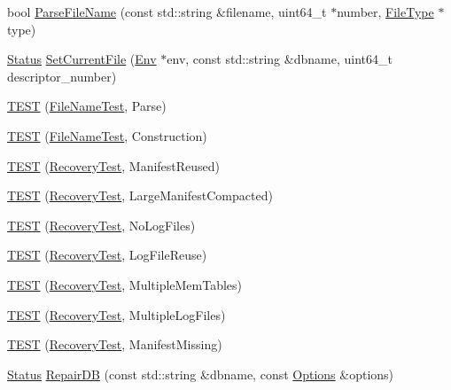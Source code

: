 \begin{DoxyCompactItemize}
bool \mbox{\hyperlink{namespaceleveldb_aa6901bbe2ff664657a6d4e01ba7d6d39}{Parse\+File\+Name}} (const std\+::string \&filename, uint64\+\_\+t $\ast$number, \mbox{\hyperlink{namespaceleveldb_ab8e559ac5cadcb2b5dd531c60df944f1}{File\+Type}} $\ast$type)
\item 
\mbox{\hyperlink{classleveldb_1_1_status}{Status}} \mbox{\hyperlink{namespaceleveldb_a73133aa2e18928553d14913491b094e7}{Set\+Current\+File}} (\mbox{\hyperlink{classleveldb_1_1_env}{Env}} $\ast$env, const std\+::string \&dbname, uint64\+\_\+t descriptor\+\_\+number)
\item 
\mbox{\hyperlink{namespaceleveldb_a28c411f7a30e2e869123a26f6e69e733}{T\+E\+ST}} (\mbox{\hyperlink{classleveldb_1_1_file_name_test}{File\+Name\+Test}}, Parse)
\item 
\mbox{\hyperlink{namespaceleveldb_ac77b62bf86349926d23431e4c1c9034a}{T\+E\+ST}} (\mbox{\hyperlink{classleveldb_1_1_file_name_test}{File\+Name\+Test}}, Construction)
\item 
\mbox{\hyperlink{namespaceleveldb_a1a5632ed37f63c524d607b9c73b10d6b}{T\+E\+ST}} (\mbox{\hyperlink{classleveldb_1_1_recovery_test}{Recovery\+Test}}, Manifest\+Reused)
\item 
\mbox{\hyperlink{namespaceleveldb_ae2949639deb64fd2bfd7a0051487be20}{T\+E\+ST}} (\mbox{\hyperlink{classleveldb_1_1_recovery_test}{Recovery\+Test}}, Large\+Manifest\+Compacted)
\item 
\mbox{\hyperlink{namespaceleveldb_abe1c93674b73cd2ee2b535b1d6498ff9}{T\+E\+ST}} (\mbox{\hyperlink{classleveldb_1_1_recovery_test}{Recovery\+Test}}, No\+Log\+Files)
\item 
\mbox{\hyperlink{namespaceleveldb_ac8b953f8732e551e43aac0469c5b0177}{T\+E\+ST}} (\mbox{\hyperlink{classleveldb_1_1_recovery_test}{Recovery\+Test}}, Log\+File\+Reuse)
\item 
\mbox{\hyperlink{namespaceleveldb_abc4ef41013234e40f174a89079a7cf1a}{T\+E\+ST}} (\mbox{\hyperlink{classleveldb_1_1_recovery_test}{Recovery\+Test}}, Multiple\+Mem\+Tables)
\item 
\mbox{\hyperlink{namespaceleveldb_ae047e1c2f2021c0aaa36b4efeff1520f}{T\+E\+ST}} (\mbox{\hyperlink{classleveldb_1_1_recovery_test}{Recovery\+Test}}, Multiple\+Log\+Files)
\item 
\mbox{\hyperlink{namespaceleveldb_a727ff74a5eed159af6eff4255e8847aa}{T\+E\+ST}} (\mbox{\hyperlink{classleveldb_1_1_recovery_test}{Recovery\+Test}}, Manifest\+Missing)
\item 
\mbox{\hyperlink{classleveldb_1_1_status}{Status}} \mbox{\hyperlink{namespaceleveldb_aa19b8fd0c5732d463fbf6af09792676a}{Repair\+DB}} (const std\+::string \&dbname, const \mbox{\hyperlink{structleveldb_1_1_options}{Options}} \&options)

\end{DoxyCompactItemize}
